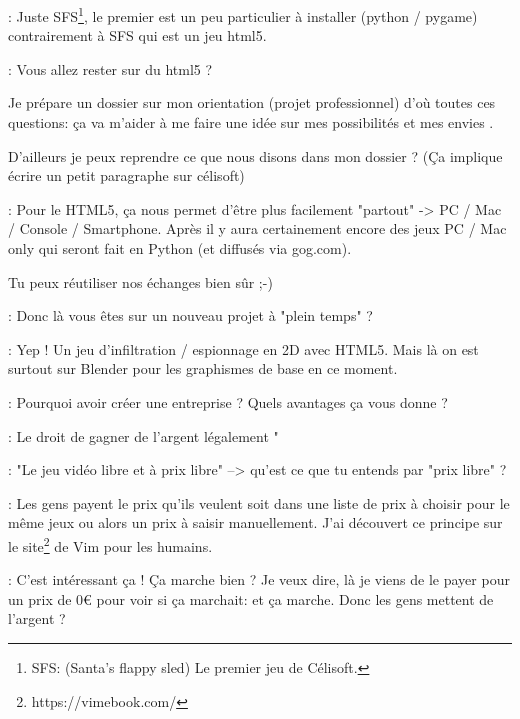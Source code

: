\documentclass[a4paper,12pt, draft]{report}
\begin{document}
\begin{description}
\item 
\item [Réponse]: Juste SFS\footnote{\textsc{SFS}: (Santa's flappy sled) Le premier jeu de Célisoft.}, le premier est un peu particulier à installer (python / pygame) contrairement à SFS qui est un jeu html5.
\item 
\item [Question]: Vous allez rester sur du html5 ?
\item Je prépare un dossier sur mon orientation (projet professionnel) d'où toutes ces questions: ça va m'aider à me faire une idée sur mes possibilités et mes envies  .
\item D'ailleurs je peux reprendre ce que nous disons dans mon dossier ? (Ça implique écrire un petit paragraphe sur célisoft)
\item 
\item [Réponse]: Pour le HTML5, ça nous permet d'être plus facilement "partout" -> PC / Mac / Console / Smartphone. Après il y aura certainement encore des jeux PC / Mac only qui seront fait en Python (et diffusés via gog.com).
\item Tu peux réutiliser nos échanges bien sûr ;-)
\item 
\item [Question]: Donc là vous êtes sur un nouveau projet à "plein temps" ?
\item 
\item [Réponse]: Yep ! Un jeu d'infiltration / espionnage en 2D avec HTML5. Mais là on est surtout sur Blender pour les graphismes de base en ce moment.
\item 
\item [Question]: Pourquoi avoir créer une entreprise ? Quels avantages ça vous donne ?
\item 
\item [Réponse]: Le droit de gagner de l'argent légalement  "
\item 
\item [Question]: "Le jeu vidéo libre et à prix libre" --> qu'est ce que tu entends par "prix libre" ?  
\item 
\item [Réponse]: Les gens payent le prix qu'ils veulent soit dans une liste de prix à choisir pour le même jeux ou alors un prix à saisir manuellement. J'ai découvert ce principe sur le site\footnote{https://vimebook.com/} de Vim pour les humains.
\item 
\item [Question]: C'est intéressant ça ! Ça marche bien ? Je veux dire, là je viens de le payer pour un prix de 0€ pour voir si ça marchait: et ça marche. Donc les gens mettent de l'argent ?

\end{description}
\end{document}
